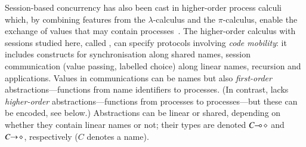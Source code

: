 \documentclass[preprint,11pt]{elsarticle}
\begin{document}
Session-based concurrency has also been cast in {higher-order} process
calculi which, by combining features from the $\lambda$-calculus and the $\pi$-calculus, 
enable the exchange of values 
that may contain processes~\cite{tlca07,DBLP:journals/jfp/GayV10}. 
The higher-order calculus with sessions studied here, called \HOp,
can specify protocols involving \emph{code mobility}: it includes
constructs for 
synchronisation along shared names, 
session communication (value passing, labelled choice) along linear names,
recursion 
 and applications.
Values in communications can be names but also \emph{first-order} abstractions---functions from name identifiers to processes. 
 (In contrast, \HOp lacks \emph{higher-order} abstractions---functions from processes to processes---but these can be encoded, see below.)
Abstractions can be linear or shared, depending on whether they contain linear names or not; their types are  denoted $C\!\! \multimap\! \diamond$ and $C\!\! \rightarrow\! \diamond$, respectively ($C$ 
denotes a name). 

\end{document}
